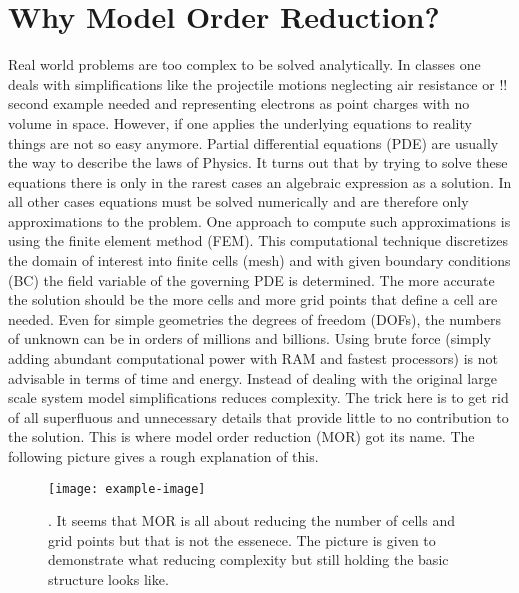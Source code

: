 \documentclass{scrartcl}
\begin{document}
\section{Why Model Order Reduction?}
{}

Real world problems are too complex to be solved analytically. In classes one deals with simplifications like the projectile motions neglecting air resistance or \alert{!! second example needed} and representing electrons as point charges with no volume in space. However, if one applies the underlying equations to reality things are not so easy anymore. Partial differential equations (PDE) are usually the way to describe the laws of Physics. It turns out that by trying to solve these equations there is only in the rarest cases an algebraic expression as a solution. In all other cases equations must be solved numerically and are therefore only approximations to the problem. One approach to compute such approximations is using the finite element method (FEM). This computational technique discretizes the domain of interest into finite cells (mesh) and with given boundary conditions (BC) the field variable of the governing PDE is determined. The more accurate the solution should be the more cells and more grid points that define a cell are needed. Even for simple geometries the degrees of freedom (DOFs), \ie{} the numbers of unknown can be in orders of millions and billions. Using brute force (simply adding abundant computational power with RAM and fastest processors) is not advisable in terms of time and energy. Instead of dealing with the original large scale system model simplifications reduces complexity. The trick here is to get rid of all superfluous and unnecessary details that provide little to no contribution to the solution. This is where model order reduction (MOR) got its name. The following picture gives a rough explanation of this.
\begin{figure}[H]
	\texttt{[image: example-image]}
	\caption{\cite[2]{benner2021model}. It seems that MOR is all about reducing the number of cells and grid points but that is not the essenece. The picture is given to demonstrate what reducing complexity but still holding the basic structure looks like.}
	\label{}
\end{figure}
\end{document}
